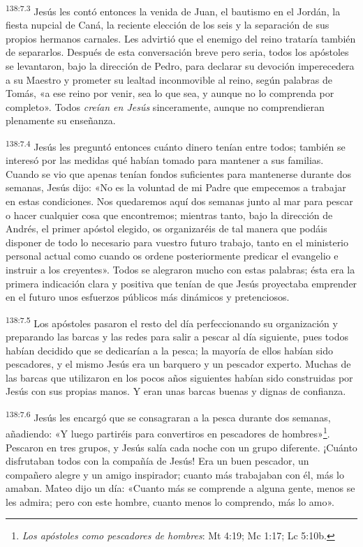 \par 
\textsuperscript{138:7.3} Jesús les contó entonces la venida de Juan, el bautismo en el Jordán, la fiesta nupcial de Caná, la reciente elección de los seis y la separación de sus propios hermanos carnales. Les advirtió que el enemigo del reino trataría también de separarlos. Después de esta conversación breve pero seria, todos los apóstoles se levantaron, bajo la dirección de Pedro, para declarar su devoción imperecedera a su Maestro y prometer su lealtad inconmovible al reino, según palabras de Tomás, «a ese reino por venir, sea lo que sea, y aunque no lo comprenda por completo». Todos \textit{creían en Jesús} sinceramente, aunque no comprendieran plenamente su enseñanza.

\par 
\textsuperscript{138:7.4} Jesús les preguntó entonces cuánto dinero tenían entre todos; también se interesó por las medidas qué habían tomado para mantener a sus familias. Cuando se vio que apenas tenían fondos suficientes para mantenerse durante dos semanas, Jesús dijo: «No es la voluntad de mi Padre que empecemos a trabajar en estas condiciones. Nos quedaremos aquí dos semanas junto al mar para pescar o hacer cualquier cosa que encontremos; mientras tanto, bajo la dirección de Andrés, el primer apóstol elegido, os organizaréis de tal manera que podáis disponer de todo lo necesario para vuestro futuro trabajo, tanto en el ministerio personal actual como cuando os ordene posteriormente predicar el evangelio e instruir a los creyentes». Todos se alegraron mucho con estas palabras; ésta era la primera indicación clara y positiva que tenían de que Jesús proyectaba emprender en el futuro unos esfuerzos públicos más dinámicos y pretenciosos.

\par 
\textsuperscript{138:7.5} Los apóstoles pasaron el resto del día perfeccionando su organización y preparando las barcas y las redes para salir a pescar al día siguiente, pues todos habían decidido que se dedicarían a la pesca; la mayoría de ellos habían sido pescadores, y el mismo Jesús era un barquero y un pescador experto. Muchas de las barcas que utilizaron en los pocos años siguientes habían sido construidas por Jesús con sus propias manos. Y eran unas barcas buenas y dignas de confianza.

\par 
\textsuperscript{138:7.6} Jesús les encargó que se consagraran a la pesca durante dos semanas, añadiendo: «Y luego partiréis para convertiros en pescadores de hombres»\footnote{\textit{Los apóstoles como pescadores de hombres}: Mt 4:19; Mc 1:17; Lc 5:10b.}. Pescaron en tres grupos, y Jesús salía cada noche con un grupo diferente. ¡Cuánto disfrutaban todos con la compañía de Jesús! Era un buen pescador, un compañero alegre y un amigo inspirador; cuanto más trabajaban con él, más lo amaban. Mateo dijo un día: «Cuanto más se comprende a alguna gente, menos se les admira; pero con este hombre, cuanto menos lo comprendo, más lo amo».

